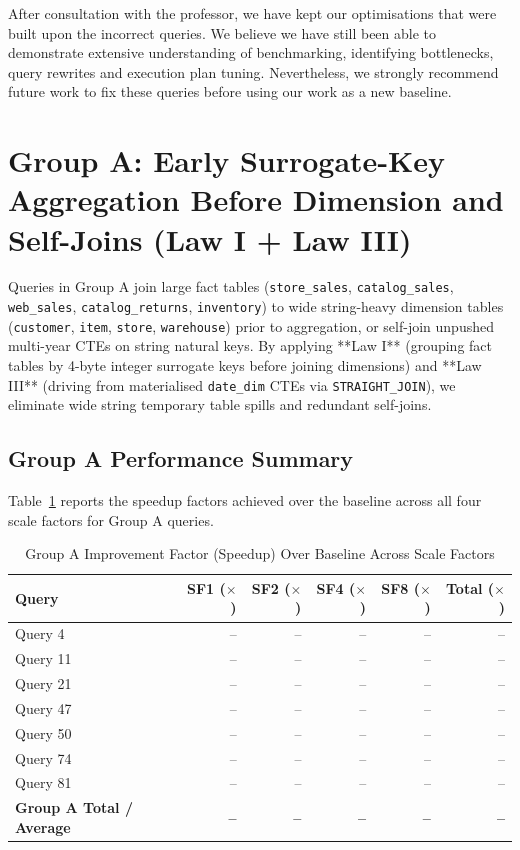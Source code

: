 \documentclass{ULBreport}
\begin{document}
After consultation with the professor, we have kept our optimisations that were built upon the incorrect queries. We believe we have still been able to demonstrate extensive understanding of benchmarking, identifying bottlenecks, query rewrites and execution plan tuning. Nevertheless, we strongly recommend future work to fix these queries before using our work as a new baseline. 
\section{Group A: Early Surrogate-Key Aggregation Before Dimension and Self-Joins (Law I + Law III)}

Queries in Group A join large fact tables (\texttt{store\_sales}, \texttt{catalog\_sales}, \texttt{web\_sales}, \texttt{catalog\_returns}, \texttt{inventory}) to wide string-heavy dimension tables (\texttt{customer}, \texttt{item}, \texttt{store}, \texttt{warehouse}) prior to aggregation, or self-join unpushed multi-year CTEs on string natural keys. By applying **Law I** (grouping fact tables by 4-byte integer surrogate keys before joining dimensions) and **Law III** (driving from materialised \texttt{date\_dim} CTEs via \texttt{STRAIGHT\_JOIN}), we eliminate wide string temporary table spills and redundant self-joins.

\subsection{Group A Performance Summary}
Table~\ref{tab:group_a_results} reports the speedup factors achieved over the baseline across all four scale factors for Group A queries.

\begin{table}[htbp]
\centering
\caption{Group A Improvement Factor (Speedup) Over Baseline Across Scale Factors}
\label{tab:group_a_results}
\begin{tabular}{@{}lrrrrr@{}}
\toprule
\textbf{Query} & \textbf{SF1 ($\times$)} & \textbf{SF2 ($\times$)} & \textbf{SF4 ($\times$)} & \textbf{SF8 ($\times$)} & \textbf{Total ($\times$)} \\ \midrule
Query 4  & -- & -- & -- & -- & -- \\
Query 11 & -- & -- & -- & -- & -- \\
Query 21 & -- & -- & -- & -- & -- \\
Query 47 & -- & -- & -- & -- & -- \\
Query 50 & -- & -- & -- & -- & -- \\
Query 74 & -- & -- & -- & -- & -- \\
Query 81 & -- & -- & -- & -- & -- \\ \midrule
\textbf{Group A Total / Average} & \textbf{--} & \textbf{--} & \textbf{--} & \textbf{--} & \textbf{--} \\ \bottomrule
\end{tabular}
\end{table}
\end{document}
